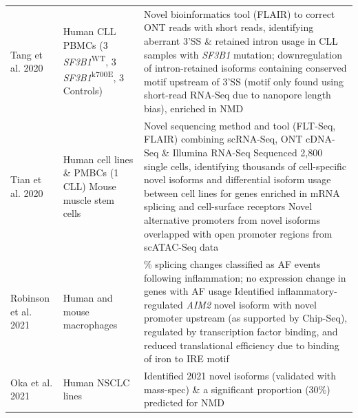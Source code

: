 \begin{changemargin}{1.5cm}
\begin{landscape}
\begin{longtable}[c]{p{4cm}p{4cm}p{18cm}}
			\centering Tang et al. 2020 \cite{Tang2020} &
			\centering Human CLL PBMCs \newline (3 \textit{SF3B1}\textsuperscript{WT}, 3 \textit{SF3B1}\textsuperscript{k700E}, 3 Controls) &
			\tabitem Novel bioinformatics tool (FLAIR) to correct ONT reads with short reads, identifying aberrant 3'SS \& retained intron usage in CLL samples with \textit{SF3B1} mutation; downregulation of intron-retained isoforms containing conserved motif upstream of 3'SS (motif only found using short-read RNA-Seq due to nanopore length bias), enriched in NMD  \\
			\hdashline[0.5pt/5pt]
			
			\centering Tian et al. 2020 \cite{Tian2020} &
			\centering Human cell lines \& PMBCs (1 CLL) \newline Mouse muscle stem cells &
			\tabitem Novel sequencing method and tool (FLT-Seq, FLAIR) combining scRNA-Seq, ONT cDNA-Seq \& Illumina RNA-Seq \newline 
			\tabitem Sequenced 2,800 single cells, identifying thousands of cell-specific novel isoforms and differential isoform usage between cell lines for genes enriched in mRNA splicing and cell-surface receptors \newline 
			\tabitem Novel alternative promoters from novel isoforms overlapped with open promoter regions from scATAC-Seq data\\
			\hdashline[0.5pt/5pt]
			
			
			\centering Robinson et al. 2021 \cite{Robinson2021} &
			\centering Human and mouse macrophages &
			\tabitem 50\% splicing changes classified as AF events following inflammation; no expression change in genes with AF usage \newline 
			\tabitem Identified inflammatory-regulated \textit{AIM2} novel isoform with novel promoter upstream (as supported by Chip-Seq), regulated by transcription factor binding, and reduced translational efficiency due to binding of iron to IRE motif \\
			\hdashline[0.5pt/5pt]
			
			\centering Oka et al. 2021 \cite{Oka2021} &
			\centering Human NSCLC lines &
			\tabitem Identified 2021 novel isoforms (validated with mass-spec) \& a significant proportion (30\%) predicted for NMD \\* \bottomrule
		\end{longtable}
	\end{landscape}
\end{changemargin}

